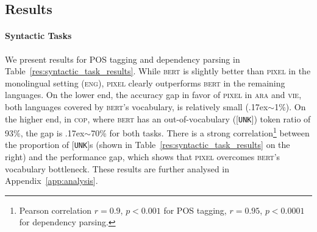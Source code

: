 \documentclass{article}
\newcommand{\model}{\textsc{pixel}\xspace}
\newcommand{\arabi}{\textsc{ara}\xspace}
\newcommand{\english}{\textsc{eng}\xspace}
\newcommand{\coptic}{\textsc{cop}\xspace}
\newcommand{\vietnamese}{\textsc{vie}\xspace}
\newcommand{\circa}{{\raise.17ex\hbox{$\scriptstyle\sim$}}}
\begin{document}
\vspace{-2mm}
\subsection{Results}
\label{sec:results}
\vspace{-2mm}

\paragraph{Syntactic Tasks} We present results for POS tagging and dependency parsing in Table~\ref{res:syntactic_task_results}. While \textsc{bert} is slightly better than \model in the monolingual setting (\english), \model clearly outperforms \textsc{bert} in the remaining languages. On the lower end, the accuracy gap in favor of \model in \arabi and \vietnamese, both languages covered by \textsc{bert}'s vocabulary, is relatively small (\circa1\%). On the higher end, in \coptic, where \textsc{bert} has an out-of-vocabulary ({\footnotesize{[\texttt{UNK}]}}) token ratio of 93\%, the gap is \circa70\% for both tasks. There is a strong correlation\footnote{Pearson correlation $r=0.9$, $p<0.001$ for POS tagging, $r=0.95$, $p<0.0001$ for dependency parsing.} between the proportion of {\footnotesize{[\texttt{UNK}]}}s (shown in Table~\ref{res:syntactic_task_results} on the right) and the performance gap, which shows that \model overcomes \textsc{bert}'s vocabulary bottleneck. These results are further analysed in Appendix~\ref{app:analysis}.
\end{document}
